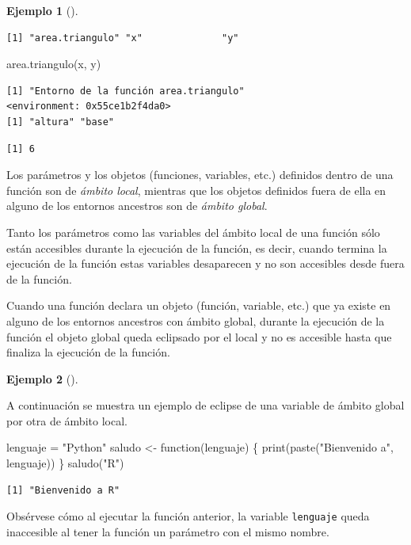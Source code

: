 \documentclass[
  a4paper,
]{scrreport}
\newenvironment{Shaded}{\begin{snugshade}}{\end{snugshade}}
\newcommand{\ControlFlowTok}[1]{\textcolor[rgb]{0.00,0.23,0.31}{#1}}
\newcommand{\FunctionTok}[1]{\textcolor[rgb]{0.28,0.35,0.67}{#1}}
\newcommand{\NormalTok}[1]{\textcolor[rgb]{0.00,0.23,0.31}{#1}}
\newcommand{\OtherTok}[1]{\textcolor[rgb]{0.00,0.23,0.31}{#1}}
\newcommand{\StringTok}[1]{\textcolor[rgb]{0.13,0.47,0.30}{#1}}
\theoremstyle{definition}
\newtheorem{example}{Ejemplo}[chapter]
\theoremstyle{definition}
\theoremstyle{remark}
\begin{document}
\begin{example}[]
\begin{verbatim}
[1] "area.triangulo" "x"              "y"             
\end{verbatim}

\begin{Shaded}
\begin{Highlighting}[]
\FunctionTok{area.triangulo}\NormalTok{(x, y)}
\end{Highlighting}
\end{Shaded}

\begin{verbatim}
[1] "Entorno de la función area.triangulo"
<environment: 0x55ce1b2f4da0>
[1] "altura" "base"  
\end{verbatim}

\begin{verbatim}
[1] 6
\end{verbatim}

\end{example}

Los parámetros y los objetos (funciones, variables, etc.) definidos
dentro de una función son de \emph{ámbito local}, mientras que los
objetos definidos fuera de ella en alguno de los entornos ancestros son
de \emph{ámbito global}.

Tanto los parámetros como las variables del ámbito local de una función
sólo están accesibles durante la ejecución de la función, es decir,
cuando termina la ejecución de la función estas variables desaparecen y
no son accesibles desde fuera de la función.

Cuando una función declara un objeto (función, variable, etc.) que ya
existe en alguno de los entornos ancestros con ámbito global, durante la
ejecución de la función el objeto global queda eclipsado por el local y
no es accesible hasta que finaliza la ejecución de la función.

\leavevmode{}%
\begin{example}[]\label{exm-eclise-variables-globales-por-locales}

A continuación se muestra un ejemplo de eclipse de una variable de
ámbito global por otra de ámbito local.

\begin{Shaded}
\begin{Highlighting}[]
\NormalTok{lenguaje }\OtherTok{=} \StringTok{"Python"}
\NormalTok{saludo }\OtherTok{\textless{}{-}} \ControlFlowTok{function}\NormalTok{(lenguaje) \{}
  \FunctionTok{print}\NormalTok{(}\FunctionTok{paste}\NormalTok{(}\StringTok{"Bienvenido a"}\NormalTok{, lenguaje))  }
\NormalTok{\}}
\FunctionTok{saludo}\NormalTok{(}\StringTok{"R"}\NormalTok{)}
\end{Highlighting}
\end{Shaded}

\begin{verbatim}
[1] "Bienvenido a R"
\end{verbatim}

Obsérvese cómo al ejecutar la función anterior, la variable
\texttt{lenguaje} queda inaccesible al tener la función un parámetro con
el mismo nombre.

\end{example}
\end{document}
